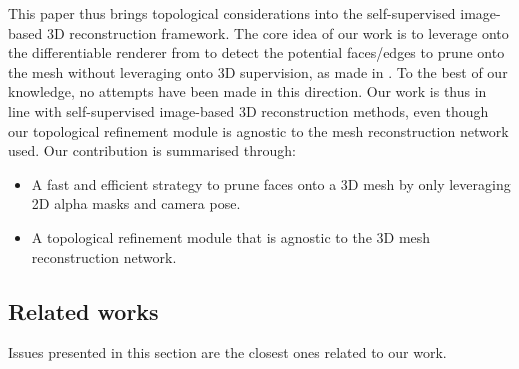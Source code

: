This paper thus brings topological considerations into the self-supervised image-based 3D reconstruction framework. The core idea of our work is to leverage onto the differentiable renderer from \citep{ravi2020accelarating} to detect the potential faces/edges to prune onto the mesh without leveraging onto 3D supervision, as made in \citep{pan2019deep,nie2020total3dunderstanding,smith2019geometrics}. To the best of our knowledge, no attempts have been made in this direction. Our work is thus in line with self-supervised image-based 3D reconstruction methods, even though our topological refinement module is agnostic to the mesh reconstruction network used. Our contribution is summarised through: 
\begin{itemize}
    
    \item A fast and efficient strategy to prune faces onto a 3D mesh by only leveraging 2D alpha masks and camera pose. 

    \item A topological refinement module that is agnostic to the 3D mesh reconstruction network.
\end{itemize}

\subsection{Related works}
\label{sec:related_works}

Issues presented in this section are the closest ones related to our work. \newline 

